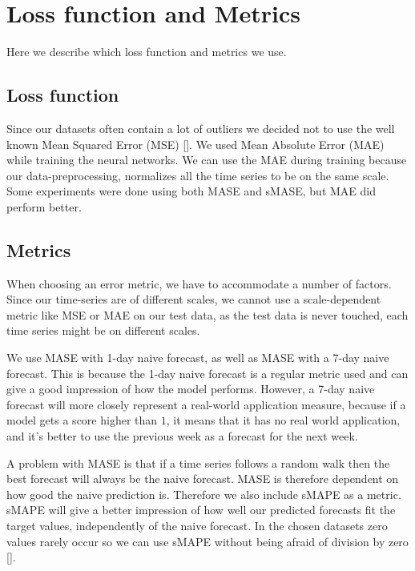
\section{Loss function and Metrics}
\label{section:Method:Metrics}

Here we describe which loss function and metrics we use.

\subsection*{Loss function}
Since our datasets often contain a lot of outliers we decided not to use the well known
Mean Squared Error (MSE) [].
We used Mean Absolute Error (MAE) while training the neural networks. We can use the MAE during training because our data-preprocessing,
normalizes all the time series to be on the same scale.
Some experiments were done using both MASE and sMASE, but MAE did perform better.

\subsection*{Metrics}
When choosing an error metric, we have to accommodate a number of factors.
Since our time-series are of different scales, we cannot use a scale-dependent metric
like MSE or MAE on our test data, as the test data is never touched, each time series might be on different scales.

We use MASE with 1-day naive forecast, as well as MASE with a 7-day
naive forecast. This is because the 1-day naive forecast is a regular metric used
and can give a good impression of how the model performs.
However, a 7-day naive forecast will more closely represent a real-world application measure,
because if a model gets a score higher than $1$, it means that it has no real world application,
and it's better to use the previous week as a forecast for the next week.

A problem with MASE is that if a time series follows a random walk
then the best forecast will always be the naive forecast. MASE is therefore dependent on
how good the naive prediction is.
Therefore we also include sMAPE as a metric.
sMAPE will give a better impression of how well our predicted forecasts fit the target values,
independently of the naive forecast.
In the chosen datasets zero values rarely occur so we can use sMAPE without
being afraid of division by zero [].

